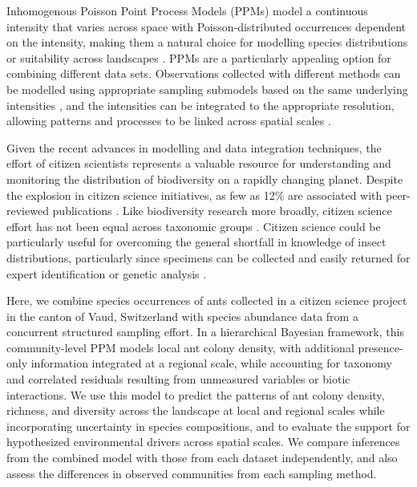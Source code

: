 \documentclass[preprint,review,times,12pt,3p]{elsarticle}
\begin{document}
Inhomogenous Poisson Point Process Models (PPMs) model a continuous intensity that varies across space with Poisson-distributed occurrences dependent on the intensity, making them a natural choice for modelling species distributions or suitability across landscapes \citep{Renner2013a,Renner2015}. PPMs are a particularly appealing option for combining different data sets. Observations collected with different methods can be modelled using appropriate sampling submodels based on the same underlying intensities \citep{Fithian2015,Hefley2016,Koshkina2017a,Fletcher2019,Renner2019}, and the intensities can be integrated to the appropriate resolution, allowing patterns and processes to be linked across spatial scales \citep{Keil2014,Hefley2016}.

Given the recent advances in modelling and data integration techniques, the effort of citizen scientists represents a valuable resource for understanding and monitoring the distribution of biodiversity on a rapidly changing planet. Despite the explosion in citizen science initiatives, as few as 12\% are associated with peer-reviewed publications \citep{Theobald2015}. Like biodiversity research more broadly, citizen science effort has not been equal across taxonomic groups \citep{Theobald2015,Troudet2017}. Citizen science could be particularly useful for overcoming the general shortfall in knowledge of insect distributions, particularly since specimens can be collected and easily returned for expert identification or genetic analysis \citep{Pernat2020}.

Here, we combine species occurrences of ants collected in a citizen science project in the canton of Vaud, Switzerland with species abundance data from a concurrent structured sampling effort. In a hierarchical Bayesian framework, this community-level PPM models local ant colony density, with additional presence-only information integrated at a regional scale, while accounting for taxonomy and correlated residuals resulting from unmeasured variables or biotic interactions. We use this model to predict the patterns of ant colony density, richness, and diversity across the landscape at local and regional scales while incorporating uncertainty in species compositions, and to evaluate the support for hypothesized environmental drivers across spatial scales. We compare inferences from the combined model with those from each dataset independently, and also assess the differences in observed communities from each sampling method. 
\end{document}
